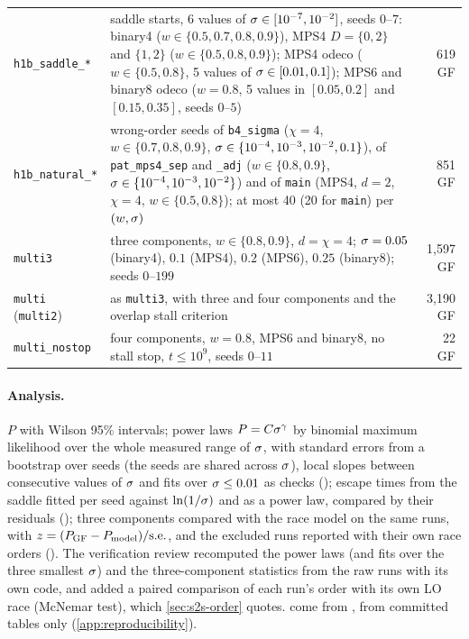 \begin{table}[ht]
\begin{tabularx}{\textwidth}{@{}>{\raggedright\arraybackslash}p{2.6cm}X r@{}}
    \texttt{h1b\_saddle\_*} & saddle starts, 6 values of $\sigma\in[10^{-7},10^{-2}]$, seeds $0$--$7$: binary4
      ($w\in\{0.5,0.7,0.8,0.9\}$), MPS4 $D=\{0,2\}$ and $\{1,2\}$ ($w\in\{0.5,0.8,0.9\}$); MPS4 odeco
      ($w\in\{0.5,0.8\}$, 5 values of $\sigma\in[0.01,0.1]$); MPS6 and binary8 odeco ($w=0.8$, 5 values in
      $[0.05,0.2]$ and $[0.15,0.35]$, seeds $0$--$5$) & 619 GF \\
    \texttt{h1b\_natural\_*} & wrong-order seeds of \texttt{b4\_sigma} ($\chi=4$, $w\in\{0.7,0.8,0.9\}$,
      $\sigma\in\{10^{-4},10^{-3},10^{-2},0.1\}$), of \texttt{pat\_mps4\_sep} and \texttt{\_adj} ($w\in\{0.8,0.9\}$,
      $\sigma\in\{10^{-4},10^{-3},10^{-2}\}$) and of \texttt{main} (MPS4, $d=2$, $\chi=4$, $w\in\{0.5,0.8\}$); at most 40
      (20 for \texttt{main}) per $(w,\sigma)$ & 851 GF \\
    \texttt{multi3} & three components, $w\in\{0.8,0.9\}$, $d=\chi=4$; $\sigma=0.05$ (binary4), $0.1$ (MPS4), $0.2$
      (MPS6), $0.25$ (binary8); seeds $0$--$199$ & 1,597 GF \\
    \texttt{multi} (\texttt{multi2}) & as \texttt{multi3}, with three and four components and the overlap stall
      criterion & 3,190 GF \\
    \texttt{multi\_nostop} & four components, $w=0.8$, MPS6 and binary8, no stall stop, $t\le10^9$, seeds
      $0$--$11$ & 22 GF \\
    \bottomrule
  \end{tabularx}
\end{table}

\paragraph{Analysis.}
$P$ with Wilson 95\% intervals; power laws $P=C\sigma^\gamma$ by binomial maximum likelihood over the whole measured
range of $\sigma$, with standard errors from a bootstrap over seeds (the seeds are shared across $\sigma$), local slopes
between consecutive values of $\sigma$ and fits over $\sigma\le0.01$ as checks (); escape times
from the saddle fitted per seed against $\ln(1/\sigma)$ and as a power law, compared by their residuals
(); three components compared with the race model on the same runs, with
$z=(P_{\rm GF}-P_{\rm model})/\mathrm{s.e.}$, and the excluded runs reported with their own race orders
(). The verification review recomputed the power laws (and fits over the three smallest
$\sigma$) and the three-component statistics from the raw runs with its own code, and added a paired comparison of
each run's order with its own LO race (McNemar test), which \cref{sec:s2s-order} quotes. 
come from , from committed tables only (\cref{app:reproducibility}).

